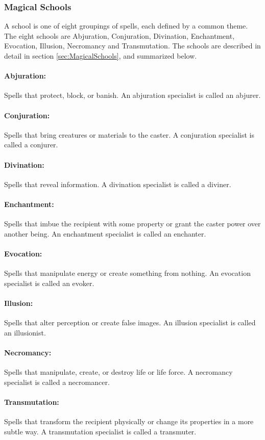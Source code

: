 \subsubsection{Magical Schools}
A school is one of eight groupings of spells, each defined by a common theme. 
The eight schools are Abjuration, Conjuration, Divination, Enchantment, Evocation, Illusion, Necromancy and Transmutation. 
The schools are described in detail in section \ref{sec:MagicalSchools}, and summarized below.

\paragraph{Abjuration:} 
Spells that protect, block, or banish. An abjuration specialist is called an abjurer.
\paragraph{Conjuration:}
Spells that bring creatures or materials to the caster. A conjuration specialist is called a conjurer.
\paragraph{Divination:}
Spells that reveal information. A divination specialist is called a diviner.
\paragraph{Enchantment:} 
Spells that imbue the recipient with some property or grant the caster power over another being. An enchantment specialist is called an enchanter.
\paragraph{Evocation:}
Spells that manipulate energy or create something from nothing. An evocation specialist is called an evoker.
\paragraph{Illusion:}
Spells that alter perception or create false images. An illusion specialist is called an illusionist.
\paragraph{Necromancy:} 
Spells that manipulate, create, or destroy life or life force. A necromancy specialist is called a necromancer.
\paragraph{Transmutation:}
Spells that transform the recipient physically or change its properties in a more subtle way. A transmutation specialist is called a transmuter.
